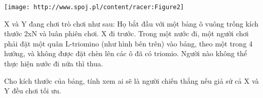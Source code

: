 \texttt{[image: http://www.spoj.pl/content/racer:Figure2]}

X và Y đang chơi trò chơi như sau: Họ bắt đầu với một bảng ô vuông trống kích thước 2xN và luân phiên chơi. X đi trước. Trong một nước đi, một người chơi phải đặt một quân L-triomino (như hình bên trên) vào bảng, theo một trong 4 hướng, và không được đặt chèn lên các ô đã có triomio. Người nào không thể thực hiện nước đi nữa thì thua.

Cho kích thước của bảng, tính xem ai sẽ là người chiến thắng nếu giả sử cả X và Y đều chơi tối ưu.